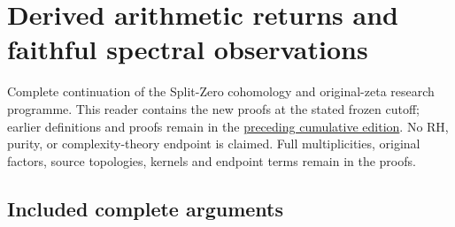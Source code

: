 \chapter{Derived arithmetic returns and faithful spectral
observations}\label{derived-arithmetic-returns-and-faithful-spectral-observations}

Complete continuation of the Split-Zero cohomology and original-zeta
research programme. This reader contains the new proofs at the stated
frozen cutoff; earlier definitions and proofs remain in the
\href{https://github.com/KokunoYumeto/zeta-function-research-reader/blob/36a82ecca98addb8a98b48204e349737856c7223/workbenches/splitzero-tandem/continuations/20260924-cohomology-weight-and-character-lifts/README.md}{preceding
cumulative edition}. No RH, purity, or complexity-theory endpoint is
claimed. Full multiplicities, original factors, source topologies,
kernels and endpoint terms remain in the proofs.

\section{Included complete arguments}\label{included-complete-arguments}

